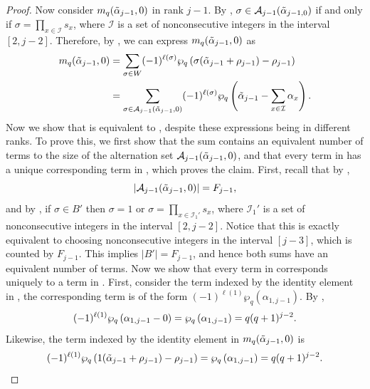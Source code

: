 \documentclass[10pt]{article}
\newcommand{\hr}[0]{\Tilde{\alpha}}
\newcommand{\qpartition}[1]{\wp_q\left(#1\right)}
\begin{document}
\begin{proof}
    Now consider $m_q(\hr_{j-1},0)$ in rank $j-1$. By , $\sigma\in \mathcal{A}_{j-1}(\hr_{j-1,0})$ if and only if $\sigma=\prod_{x\in\mathcal{I}}s_x$, where $\mathcal{I}$ is a set of nonconsecutive integers in the interval $[2,j-2]$. Therefore, by , we can express $m_q(\hr_{j-1},0)$ as
    \begin{align}
        m_q(\hr_{j-1},0) &= \sum_{\sigma\in W}(-1)^{\ell(\sigma)}\qpartition{\sigma(\hr_{j-1}+\rho_{j-1})-\rho_{j-1}} \notag \\
        &= \sum_{\sigma\in\mathcal{A}_{j-1}(\hr_{j-1},0)}(-1)^{\ell(\sigma)}\qpartition{\hr_{j-1}-\sum_{x\in\mathcal{I}}\alpha_x}.\label{extentsion: case 2 pamela match}
    \end{align}
    Now we show that  is equivalent to , despite these expressions being in different ranks. To prove this, we first show that the sum contains an equivalent number of terms to the size of the alternation set $\mathcal{A}_{j-1}(\hr_{j-1},0)$, and that every term in  has a unique corresponding term in , which proves the claim. First, recall that by ,
    \begin{equation}
        |\mathcal{A}_{j-1}(\hr_{j-1},0)|=F_{j-1},\notag
    \end{equation}
    and by , if $\sigma\in B'$ then $\sigma=1$ or $\sigma=\prod_{x\in\mathcal{I}_1'}s_x$, where $\mathcal{I}_1'$ is a set of nonconsecutive integers in the interval $[2,j-2]$. Notice that this is exactly equivalent to choosing nonconsecutive integers in the interval $[j-3]$, which is counted by $F_{j-1}$. This implies $|B'|=F_{j-1}$, and hence both sums have an equivalent number of terms. Now we show that every term in  corresponds uniquely to a term in . First, consider the term indexed by the identity element in , the corresponding term is of the form $(-1)^{\ell(1)}\qpartition{\alpha_{1,j-1}}$. By , 
    \begin{equation}
       (-1)^{\ell(1)}\qpartition{\alpha_{1,j-1}-0}=\qpartition{\alpha_{1,j-1}} = q(q+1)^{j-2}. \notag
    \end{equation}
    Likewise, the term indexed by the identity element in $m_q(\hr_{j-1},0)$ is
    \begin{equation}
        (-1)^{\ell(1)}\qpartition{1(\hr_{j-1}+\rho_{j-1})-\rho_{j-1}}= \qpartition{\alpha_{1,j-1}}=q(q+1)^{j-2}.\notag

\end{equation}
\end{proof}
\end{document}
